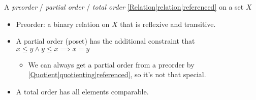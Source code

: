 

A \emph{preorder} / \emph{partial order} / \emph{total order} \ref{Relation|relation|referenced} on a set $X$

\begin{itemize}
    \item Preorder: a binary relation on $X$ that is reflexive and transitive.
    \item A partial order (poset) has the additional constraint that $x \leq y \land y \leq x \implies x=y$
          \begin{itemize}\item We can always get a partial order from a preorder by \ref{Quotient|quotienting|referenced}, so it's not that special.\end{itemize}
    \item A total order has all elements comparable.
  \end{itemize}